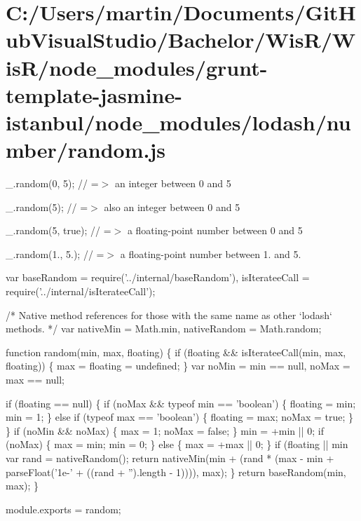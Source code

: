 \hypertarget{_c_1_2_users_2martin_2_documents_2_git_hub_visual_studio_2_bachelor_2_wis_r_2_wis_r_2node_module198fce3c192c675a0799b77d321a5efd}{}\section{C\+:/\+Users/martin/\+Documents/\+Git\+Hub\+Visual\+Studio/\+Bachelor/\+Wis\+R/\+Wis\+R/node\+\_\+modules/grunt-\/template-\/jasmine-\/istanbul/node\+\_\+modules/lodash/number/random.\+js}
\+\_\+.\+random(0, 5); // =$>$ an integer between 0 and 5

\+\_\+.\+random(5); // =$>$ also an integer between 0 and 5

\+\_\+.\+random(5, true); // =$>$ a floating-\/point number between 0 and 5

\+\_\+.\+random(1., 5.); // =$>$ a floating-\/point number between 1. and 5.


\begin{DoxyCodeInclude}
var baseRandom = require(\textcolor{stringliteral}{'../internal/baseRandom'}),
    isIterateeCall = require(\textcolor{stringliteral}{'../internal/isIterateeCall'});

\textcolor{comment}{/* Native method references for those with the same name as other `lodash` methods. */}
var nativeMin = Math.min,
    nativeRandom = Math.random;

\textcolor{keyword}{function} random(min, max, floating) \{
  \textcolor{keywordflow}{if} (floating && isIterateeCall(min, max, floating)) \{
    max = floating = undefined;
  \}
  var noMin = min == null,
      noMax = max == null;

  \textcolor{keywordflow}{if} (floating == null) \{
    \textcolor{keywordflow}{if} (noMax && typeof min == \textcolor{stringliteral}{'boolean'}) \{
      floating = min;
      min = 1;
    \}
    \textcolor{keywordflow}{else} \textcolor{keywordflow}{if} (typeof max == \textcolor{stringliteral}{'boolean'}) \{
      floating = max;
      noMax = \textcolor{keyword}{true};
    \}
  \}
  \textcolor{keywordflow}{if} (noMin && noMax) \{
    max = 1;
    noMax = \textcolor{keyword}{false};
  \}
  min = +min || 0;
  \textcolor{keywordflow}{if} (noMax) \{
    max = min;
    min = 0;
  \} \textcolor{keywordflow}{else} \{
    max = +max || 0;
  \}
  \textcolor{keywordflow}{if} (floating || min %
    var rand = nativeRandom();
    \textcolor{keywordflow}{return} nativeMin(min + (rand * (max - min + parseFloat(\textcolor{stringliteral}{'1e-'} + ((rand + \textcolor{stringliteral}{''}).length - 1)))), max);
  \}
  \textcolor{keywordflow}{return} baseRandom(min, max);
\}

module.exports = random;
\end{DoxyCodeInclude}
 